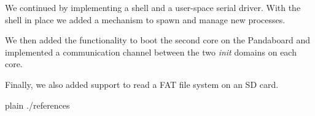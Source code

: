\documentclass[a4paper,10pt]{article}
\begin{document}
We continued by implementing a shell and a user-space serial driver.
With the shell in place we added a mechanism to spawn and manage new processes.

We then added the functionality to boot the second core on the Pandaboard and implemented a communication channel between the two \emph{init} domains on each core.

Finally, we also added support to read a FAT file system on an SD card.

\begin{flushleft}
{{{
 {plain}
 {./references}
}}}
\end{flushleft}


\todos
\end{document}
